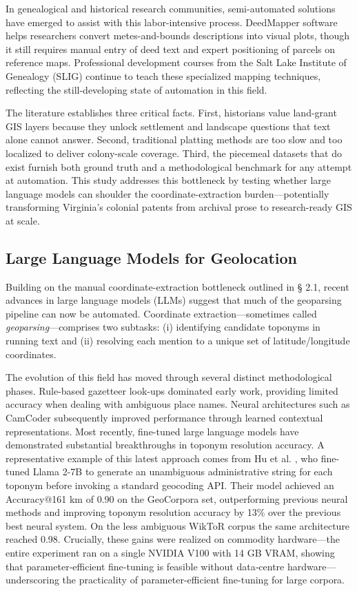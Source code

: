 In genealogical and historical research communities, semi-automated
solutions have emerged to assist with this labor-intensive process.
DeedMapper software \citep{DeedMapper_software} helps researchers
convert metes-and-bounds descriptions into visual plots, though it still
requires manual entry of deed text and expert positioning of parcels on
reference maps. Professional development courses from the Salt Lake
Institute of Genealogy (SLIG) continue to teach these specialized
mapping techniques, reflecting the still-developing state of automation
in this field.

The literature establishes three critical facts. First, historians value
land-grant GIS layers because they unlock settlement and landscape
questions that text alone cannot answer. Second, traditional platting
methods are too slow and too localized to deliver colony-scale coverage.
Third, the piecemeal datasets that do exist furnish both ground truth
and a methodological benchmark for any attempt at automation. This study
addresses this bottleneck by testing whether large language models can
shoulder the coordinate-extraction burden---potentially transforming
Virginia's colonial patents from archival prose to research-ready GIS at
scale.

\subsection{Large Language Models for
Geolocation}\label{large-language-models-for-geolocation}

Building on the manual coordinate-extraction bottleneck outlined in §
2.1, recent advances in large language models (LLMs) suggest that much
of the geoparsing pipeline can now be automated. Coordinate
extraction---sometimes called \emph{geoparsing}---comprises two
subtasks: (i) identifying candidate toponyms in running text and (ii)
resolving each mention to a unique set of latitude/longitude
coordinates.

The evolution of this field has moved through several distinct
methodological phases. Rule-based gazetteer look-ups dominated early
work, providing limited accuracy when dealing with ambiguous place
names. Neural architectures such as CamCoder \citep{Gritta2018_camcoder}
subsequently improved performance through learned contextual
representations. Most recently, fine-tuned large language models have
demonstrated substantial breakthroughs in toponym resolution accuracy. A
representative example of this latest approach comes from Hu et al.
\citep{Hu2024_toponym_llm}, who fine-tuned Llama 2-7B to generate an
unambiguous administrative string for each toponym before invoking a
standard geocoding API. Their model achieved an Accuracy@161 km of 0.90
on the GeoCorpora set, outperforming previous neural methods and
improving toponym resolution accuracy by 13\% over the previous best
neural system. On the less ambiguous WikToR corpus the same architecture
reached 0.98. Crucially, these gains were realized on commodity
hardware---the entire experiment ran on a single NVIDIA V100 with 14 GB
VRAM, showing that parameter‑efficient fine‑tuning is feasible without
data‑centre hardware---underscoring the practicality of
parameter-efficient fine-tuning for large corpora.

